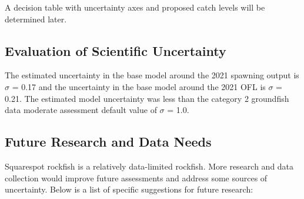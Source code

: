 \documentclass[11pt,
  english,
  a4paper,
]{article}
\begin{document}
\leavevmode\tagmcend\tagstructend\par


A decision table with uncertainty axes and proposed catch levels will be determined later.

\leavevmode\tagmcend\tagstructend\par


\hypertarget{evaluation-of-scientific-uncertainty}{%
\subsection{Evaluation of Scientific Uncertainty}\label{evaluation-of-scientific-uncertainty}}

\leavevmode\tagmcend\tagstructend


The estimated uncertainty in the base model around the 2021 spawning output is {\(\sigma\)\leavevmode\tagmcend\tagstructend} = 0.17 and the uncertainty in the base model around the 2021 OFL is {\(\sigma\)\leavevmode\tagmcend\tagstructend} = 0.21. The estimated model uncertainty was less than the category 2 groundfish data moderate assessment default value of {\(\sigma\)\leavevmode\tagmcend\tagstructend} = 1.0.

\leavevmode\tagmcend\tagstructend\par


\hypertarget{future-research-and-data-needs}{%
\subsection{Future Research and Data Needs}\label{future-research-and-data-needs}}

\leavevmode\tagmcend\tagstructend


Squarespot rockfish is a relatively data-limited rockfish. More research and data collection would improve future assessments and address some sources of uncertainty. Below is a list of specific suggestions for future research:
\end{document}
